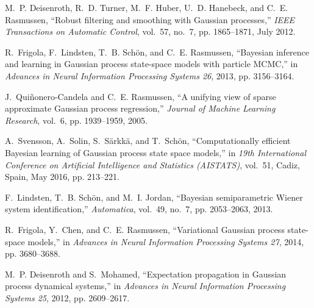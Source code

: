 \documentclass[12pt]{article}
\begin{document}
\begin{thebibliography}{1}	
  M.~P. Deisenroth, R.~D. Turner, M.~F. Huber, U.~D. Hanebeck, and C.~E.
    Rasmussen, ``Robust filtering and smoothing with {Gaussian} processes,''
    \emph{IEEE Transactions on Automatic Control}, vol.~57, no.~7, pp.
    1865--1871, July 2012.

  R.~Frigola, F.~Lindsten, T.~B. Sch\"on, and C.~E. Rasmussen, ``{Bayesian}
    inference and learning in {Gaussian} process state-space models with particle
    {MCMC},'' in \emph{Advances in Neural Information Processing Systems 26},
    2013, pp. 3156--3164.

  J.~Quiñonero-Candela and C.~E. Rasmussen, ``A unifying view of sparse
    approximate {Gaussian} process regression,'' \emph{Journal of Machine
    Learning Research}, vol.~6, pp. 1939--1959, 2005.

  A.~Svensson, A.~Solin, S.~S\"arkk\"a, and T.~Sch\"on, ``Computationally efficient
    {Bayesian} learning of {Gaussian} process state space models,'' in \emph{19th
    International Conference on Artificial Intelligence and Statistics
    (AISTATS)}, vol.~51, Cadiz, Spain, May 2016, pp. 213--221.

  F.~Lindsten, T.~B. Sch\"on, and M.~I. Jordan, ``Bayesian semiparametric {Wiener}
    system identification,'' \emph{Automatica}, vol.~49, no.~7, pp. 2053--2063,
    2013.

  R.~Frigola, Y.~Chen, and C.~E. Rasmussen, ``Variational {Gaussian} process
    state-space models,'' in \emph{Advances in Neural Information Processing
    Systems 27}, 2014, pp. 3680--3688.

  M.~P. Deisenroth and S.~Mohamed, ``Expectation propagation in {Gaussian}
    process dynamical systems,'' in \emph{Advances in Neural Information
    Processing Systems 25}, 2012, pp. 2609--2617.
\end{thebibliography}
\end{document}
